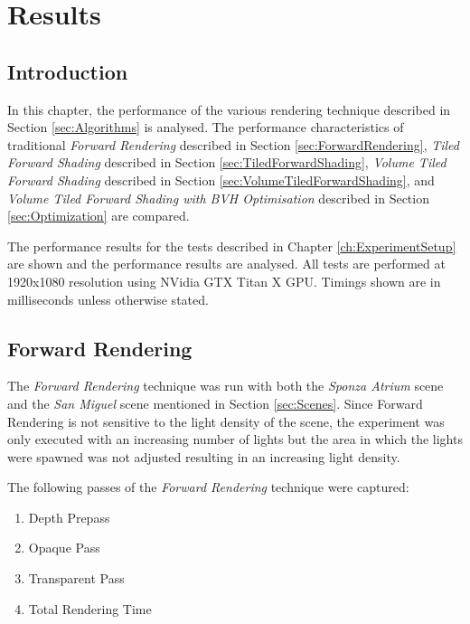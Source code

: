 
\chapter{Results} %
\label{ch:Results}

\section{Introduction}

In this chapter, the performance of the various rendering technique described in Section \ref{sec:Algorithms} is analysed. The performance characteristics of traditional \emph{Forward Rendering} described in Section \ref{sec:ForwardRendering}, \emph{Tiled Forward Shading} described in Section \ref{sec:TiledForwardShading}, \emph{Volume Tiled Forward Shading} described in Section \ref{sec:VolumeTiledForwardShading}, and \emph{Volume Tiled Forward Shading with BVH Optimisation} described in Section \ref{sec:Optimization} are compared.

The performance results for the tests described in Chapter \ref{ch:ExperimentSetup} are shown and the performance results are analysed. All tests are performed at 1920x1080 resolution using NVidia GTX Titan X GPU. Timings shown are in milliseconds unless otherwise stated.

\section{Forward Rendering}

The \emph{Forward Rendering} technique was run with both the \emph{Sponza Atrium} \parencite{22_crytek_2017} scene and the \emph{San Miguel} \parencite{McGuire2011Data} scene mentioned in Section \ref{sec:Scenes}. Since Forward Rendering is not sensitive to the light density of the scene, the experiment was only executed with an increasing number of lights but the area in which the lights were spawned was not adjusted resulting in an increasing light density.

The following passes of the \emph{Forward Rendering} technique were captured:

\begin{enumerate}
\item{Depth Prepass}
\item{Opaque Pass}
\item{Transparent Pass}
\item{Total Rendering Time}
\end{enumerate}

